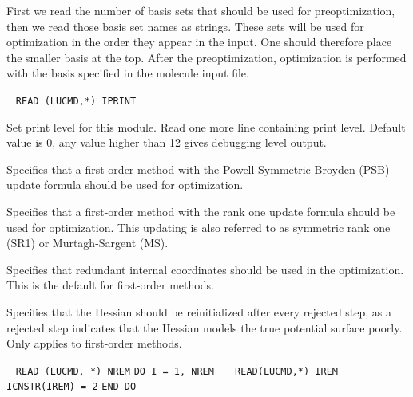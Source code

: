 \begin{description}
First we read the number of basis sets that should be
used for preoptimization, then we read those
basis set names as strings. These
sets will be used for optimization in the order they appear in the
input. One should therefore place the smaller basis at the
top. After the preoptimization, optimization is performed with the
basis specified in the molecule input file.

\item[\Key{PRINT}]\verb| |
\newline
\verb|READ (LUCMD,*) IPRINT|

Set print level for this module.  Read one more line containing print
level. Default value is 0, any value higher than 12 gives debugging
level output.

\item[\Key{PSB}]
Specifies that a first-order method with the
Powell-Symmetric-Broyden (PSB)
update formula should be used for optimization.


\item[\Key{RANKON}]
Specifies that a first-order method with the rank one update
formula should be used for optimization. This updating is also
referred to as symmetric rank one (SR1) or Murtagh-Sargent (MS).

\item[\Key{REDINT}]
Specifies that redundant internal coordinates
should be used in the optimization. This is the default for
first-order methods.

\item[\Key{REJINI}]
Specifies that the Hessian should be
reinitialized after every
rejected step, as a rejected step
indicates that the Hessian models the
true potential surface poorly. Only applies to first-order
methods.

\item[\Key{REMOVE}]\verb| |\newline
\verb|READ (LUCMD, *) NREM|\newline
\verb|DO I = 1, NREM|\newline
\verb|   READ(LUCMD,*) IREM|\newline
\verb|   ICNSTR(IREM) = 2|\newline
\verb|END DO|


\end{description}

